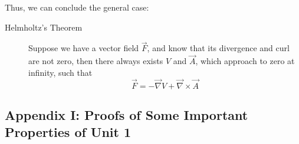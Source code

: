 \documentclass[12pt,a4paper,twoside]{article}
\numberwithin{equation}{section}
\begin{document}
	\noindent Thus, we can conclude the general case:
	\begin{description}
	    \item [Helmholtz's Theorem] Suppose we have a vector field $\overrightarrow{F}$, and know that its divergence and curl are not zero, then there always exists $V$ and $\overrightarrow{A}$, which approach to zero at infinity, such that
	    \begin{equation}
	        \overrightarrow{F}=-\overrightarrow{\nabla}V+\overrightarrow{\nabla}\times\overrightarrow{A}
	    \end{equation}
	\end{description}
	\newpage
	
	
	\subsection{Appendix I: Proofs of Some Important Properties of Unit 1}
\end{document}
